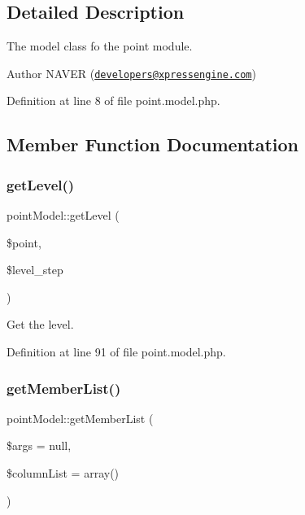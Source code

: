 \subsection{Detailed Description}
The model class fo the point module. 

\begin{DoxyAuthor}{Author}
N\+A\+V\+ER (\href{mailto:developers@xpressengine.com}{\tt developers@xpressengine.\+com}) 
\end{DoxyAuthor}


Definition at line 8 of file point.\+model.\+php.



\subsection{Member Function Documentation}
\mbox{\label{classpointModel_aaada8e8cba6e965f06c2b25e4974537c}} 
\subsubsection{\texorpdfstring{get\+Level()}{getLevel()}}
{\footnotesize\ttfamily point\+Model\+::get\+Level (\begin{DoxyParamCaption}\item[{}]{\$point,  }\item[{}]{\$level\+\_\+step }\end{DoxyParamCaption})}



Get the level. 



Definition at line 91 of file point.\+model.\+php.

\mbox{\label{classpointModel_ab3b968a740e10f9039da99adae67dcb7}} 
\subsubsection{\texorpdfstring{get\+Member\+List()}{getMemberList()}}
{\footnotesize\ttfamily point\+Model\+::get\+Member\+List (\begin{DoxyParamCaption}\item[{}]{\$args = {\ttfamily null},  }\item[{}]{\$column\+List = {\ttfamily array()} }\end{DoxyParamCaption})}



